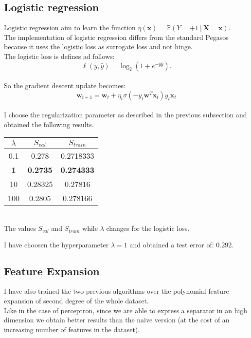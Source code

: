 \subsection{Logistic regression} \label{sub:logreg}
Logistic regression aim to learn the function $\eta(\boldsymbol{x}) = \mathbb{P}(Y = +1\ |\ \textbf{X} = \boldsymbol{x})$.\\
The implementation of logistic regression differs from the standard Pegasos because it uses the logistic loss as surrogate loss and not hinge.\\
The logistic loss is defines ad follows: $$\ell(y, \hat{y}) = \log_2 (1+e^{-y\hat{y}}).$$\\
So the gradient descent update becomes: $$\boldsymbol{w}_{t+1} = \boldsymbol{w}_t + \eta_t \sigma(-y_t \boldsymbol{w}^T \boldsymbol{x}_t) y_t \boldsymbol{x}_t$$\\
I choose the regularization parameter as described in the previous subsection and obtained the following results.\\
\begin{center}
    \begin{tabular}{| c | c | c |}
        \hline
        $\lambda$ & $S_{val}$ & $S_{train}$ \\
        \hline
        0.1 & 0.278 & 0.2718333 \\
        \hline
        \textbf{1} & \textbf{0.2735} & \textbf{0.274333} \\
        \hline
        10 & 0.28325 & 0.27816 \\
        \hline
        100 & 0.2805 & 0.278166 \\
        \hline
    \end{tabular}
    \\
    The values $S_{val}$ and $S_{train}$ while $\lambda$ changes for the logistic loss.\\
\end{center}

I have choosen the hyperparameter $\lambda = 1$ and obtained a test error of: 0.292.\\

\subsection{Feature Expansion}
I have also trained the two previous algorithms over the polynomial feature expansion of second degree of the whole dataset.\\
Like in the case of perceptron, since we are able to express a separator in an high dimension we obtain better results than the naive version (at the cost of an increasing number of features in the dataset).\\  
